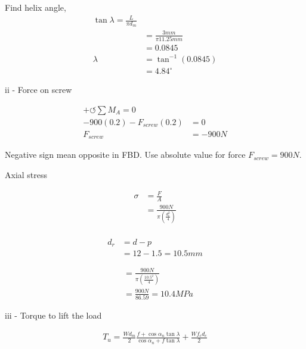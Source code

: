 \documentclass[a4paper, fleqn]{article}
\begin{document}
Find helix angle, 
\begin{equation*}
    \begin{aligned}
    \tan\lambda = \frac{L}{\pi d_m}\\
    &=\frac{3mm}{\pi 11.25mm} \\
    &=0.0845\\
    \lambda &= \tan^{-1}(0.0845)\\
    &=4.84^{\circ}
    \end{aligned}
\end{equation*}

ii - Force on screw

\begin{equation*}
    \begin{aligned}
    +\circlearrowleft \sum M_A =0\\  
    -900(0.2)-F_{screw}(0.2) &=0\\ 
    F_{screw} &= -900N
    \end{aligned}
\end{equation*}

Negative sign mean opposite in FBD. Use absolute value for force $F_{screw}= 900N$.

Axial stress

\begin{equation*}
    \begin{aligned}
    \sigma &= \frac{F}{A}\\
    &=\frac{900N}{\pi \left(\frac{d_r^2}{4}\right)}\\
    \end{aligned}
\end{equation*}

\begin{equation*}
    \begin{aligned}
    d_r &= d-p\\
    &= 12-1.5=10.5mm
    \end{aligned}
\end{equation*}

\begin{equation*}
    \begin{aligned}
    &=\frac{900N}{\pi \left(\frac{10.5^2}{4}\right)}\\
    &=\frac{900N}{86.59} = 10.4 MPa
    \end{aligned}
\end{equation*}

iii - Torque to lift the load

\begin{equation*}
    \begin{aligned}
    T_u = \frac{Wd_m}{2} \frac{f+\cos\alpha_n \tan\lambda}{\cos\alpha_n + f\tan\lambda} + \frac{Wf_c d_c}{2}
    \end{aligned}
\end{equation*}
\end{document}
